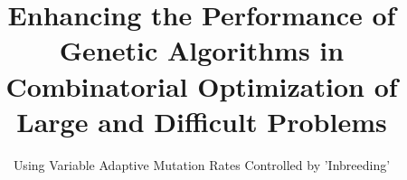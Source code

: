 \documentclass{sig-alternate}
\begin{document}
%

\title{Enhancing the Performance of Genetic Algorithms in Combinatorial Optimization of Large and Difficult Problems}
\subtitle{Using Variable Adaptive Mutation Rates Controlled by 'Inbreeding'}
%
%
%
%
%
\end{document}
